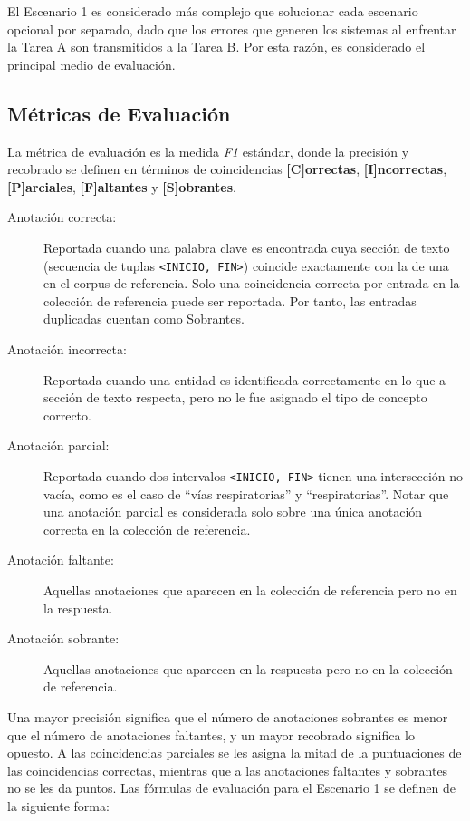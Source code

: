 El Escenario 1 es considerado más complejo que solucionar cada escenario opcional por separado, dado que los errores que generen los sistemas al enfrentar la Tarea A son transmitidos a la Tarea B.
Por esta razón, es considerado el principal medio de evaluación.

\subsection{Métricas de Evaluación}

La métrica de evaluación es la medida \textit{F1} estándar, donde la precisión y recobrado se definen en términos de coincidencias \textbf{[C]orrectas}, \textbf{[I]ncorrectas},
\textbf{[P]arciales}, \textbf{[F]altantes} y \textbf{[S]obrantes}.


\begin{description}
	
	\item[Anotación correcta:] Reportada cuando una palabra clave es encontrada cuya sección de texto (secuencia de tuplas \texttt{<INICIO, FIN>}) coincide	exactamente con la de una en el corpus de referencia.
	Solo una coincidencia correcta por entrada en la colección de referencia puede ser reportada.
	Por tanto, las entradas duplicadas cuentan como Sobrantes.
	
	\item[Anotación incorrecta:] Reportada cuando una entidad es identificada correctamente en lo que a sección de texto respecta, pero no le fue asignado el tipo de concepto correcto.
	
	\item[Anotación parcial:] Reportada cuando dos intervalos \texttt{<INICIO, FIN>} tienen una intersección no vacía, como es el caso de “vías respiratorias”	y “respiratorias”.
	Notar que una anotación parcial es considerada solo sobre una única anotación correcta en la colección de referencia.
	
	\item[Anotación faltante:] Aquellas anotaciones que aparecen en la colección de	referencia pero no en la respuesta.
	
	\item[Anotación sobrante:] Aquellas anotaciones que aparecen en la respuesta pero no en la colección de referencia.
	
\end{description}

Una mayor precisión significa que el número de anotaciones sobrantes
es menor que el número de anotaciones faltantes, y un mayor recobrado significa lo opuesto.
A las coincidencias parciales se les asigna la mitad de la
puntuaciones de las coincidencias correctas, mientras que a las anotaciones faltantes y sobrantes no se les da puntos.
Las fórmulas de evaluación para el Escenario 1 se definen de la siguiente forma:

